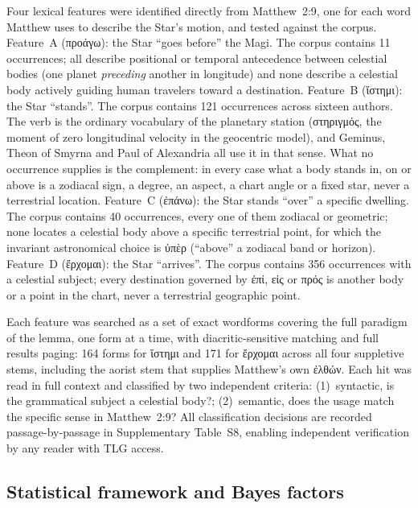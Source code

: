 \documentclass[sn-nature]{sn-jnl}
\newcommand{\grk}[1]{{\fontencoding{LGR}\selectfont #1}}
\newcommand{\grk}[1]{{\greekfont #1}}
\begin{document}
Four lexical features were identified directly from Matthew~2:9, one for each
word Matthew uses to describe the Star's motion, and tested against the corpus.
Feature~A (\grk{προάγω}): the Star ``goes before'' the Magi. The corpus
contains 11 occurrences; all describe positional or temporal
antecedence between celestial bodies (one planet \textit{preceding} another
in longitude) and none describe a celestial body actively guiding human
travelers toward a destination. Feature~B (\grk{ἵστημι}): the Star
``stands''. The corpus contains 121 occurrences across sixteen authors. The
verb is the ordinary vocabulary of the planetary station (\grk{στηριγμός}, the
moment of zero longitudinal velocity in the geocentric model), and Geminus,
Theon of Smyrna and Paul of Alexandria all use it in that sense. What no
occurrence supplies is the complement: in every case what a body stands in, on
or above is a zodiacal sign, a degree, an aspect, a chart angle or a fixed
star, never a terrestrial location. Feature~C (\grk{ἐπάνω}): the Star stands
``over'' a specific dwelling. The corpus contains 40 occurrences, every one of
them zodiacal or geometric; none locates a celestial body above a specific
terrestrial point, for which the invariant astronomical choice is
\grk{ὑπὲρ} (``above'' a zodiacal band or horizon).
Feature~D (\grk{ἔρχομαι}): the Star ``arrives''. The corpus contains 356
occurrences with a celestial subject; every destination governed by
\grk{ἐπί}, \grk{εἰς} or \grk{πρός} is another body or a point in the chart,
never a terrestrial geographic point.

Each feature was searched as a set of exact wordforms covering the full
paradigm of the lemma, one form at a time, with diacritic-sensitive matching
and full results paging: 164 forms for \grk{ἵστημι} and 171 for
\grk{ἔρχομαι} across all four suppletive stems, including the aorist stem that
supplies Matthew's own \grk{ἐλθών}.
Each hit was read in full context and classified by two
independent criteria: (1)~syntactic, is the grammatical subject a celestial
body?; (2)~semantic, does the usage match the specific sense in Matthew~2:9?
All classification decisions are recorded passage-by-passage in
Supplementary Table~S8, enabling independent verification by any reader
with TLG access.

\subsection{Statistical framework and Bayes factors}
\label{subsec:stats_methods}
\end{document}
